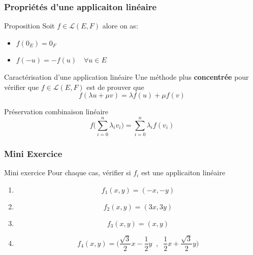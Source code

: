 \documentclass[dvipsnames]{beamer}
\begin{document}
\begin{frame}[<+->]
  \frametitle{Propriétés d'une applicaiton linéaire}
 \begin{block}{Proposition}
   \small
   Soit $f \in \mathcal{L}(E, F)$  alore on as:

   \begin{itemize}
     \item $f(0_E) = 0_F$\\[4pt]
     \item $f(-u)  = -f(u)\quad \forall u\in E$
   \end{itemize}
 \end{block} 

 \begin{block}{Caractérisation d'une application linéaire}
   \small
   Une méthode plus \textbf{concentrée}   pour vérifier que $f\in
   \mathcal{L}(E,F)$ est de prouver que 
   \begin{equation}
     f(\lambda u + \mu v) = \lambda f(u) + \mu f(v) 
   \end{equation}
 \end{block}
 \pause
 \begin{block}{Préservation combinaison linéaire}
   \small
   \begin{equation}
     f\big(\sum_{i=0}^n \lambda_i v_i\big) = \sum_{i=0}^n \lambda_i f(v_i) 
 \end{equation}
 \end{block}
\end{frame}
\begin{frame}[t]
  \frametitle{Mini Exercice}
 \begin{block}{Mini exercice}
   Pour chaque cas, vérifier si $f_i$ est une applicaiton linéaire
   \begin{enumerate}
     \item $$f_1(x,y) = (-x, -y)$$
     \item $$f_2(x,y) = (3x, 3y)$$
     \item $$f_3(x,y) = (x, y)$$
     \item $$f_4(x,y) = \big(\frac{\sqrt{3}}{2}x -
       \frac{1}{2}y\;\;,\;\; \frac{1}{2}x + \frac{\sqrt{3}}{2}y\big)$$


   \end{enumerate}
 \end{block} 
\end{frame}
\end{document}
